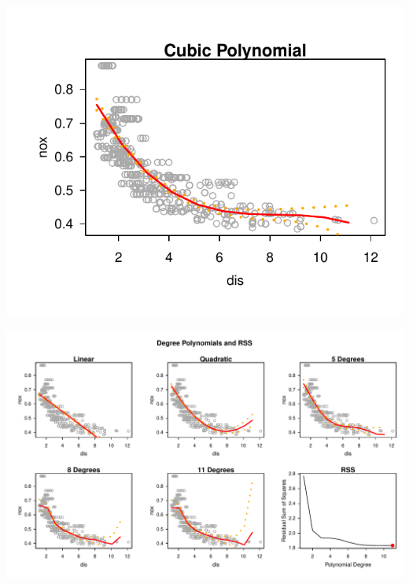 \documentclass{article}\usepackage[]{graphicx}\usepackage[]{color}
\newenvironment{knitrout}{}{} %
\begin{document}
\begin{knitrout}
{\centering \includegraphics[width=.6\linewidth]{figure/Schmidt-HW7-Rnwunnamed-chunk-2-1} 

}



\end{knitrout}
\begin{knitrout}
\color{fgcolor}

\includegraphics[width=.6\linewidth]{figure/Schmidt-HW7-Rnwunnamed-chunk-3-1} \hfill{}



\end{knitrout}
\end{document}

